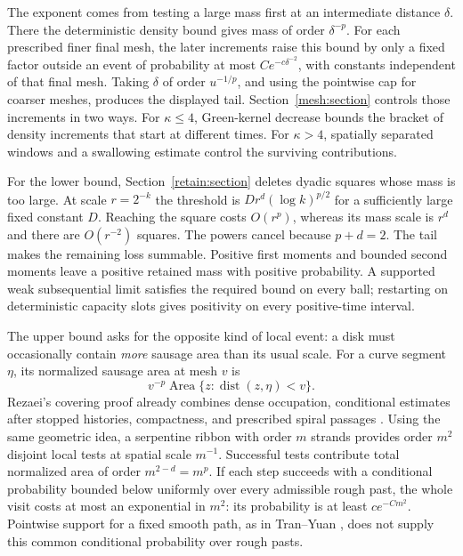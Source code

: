 The exponent comes from testing a large mass first at an intermediate
distance $\delta$. There the deterministic density bound gives mass
of order $\delta^{-p}$. For each prescribed finer final mesh, the
later increments raise this bound by only a fixed factor outside an
event of probability at most $Ce^{-c\delta^{-2}}$, with constants
independent of that final mesh. Taking $\delta$ of order $u^{-1/p}$,
and using the pointwise cap for coarser meshes, produces the displayed
tail. Section~\ref{mesh:section} controls those increments
in two ways. For $\kappa\le4$, Green-kernel decrease bounds the bracket
of density increments that start at different times. For $\kappa>4$,
spatially separated windows and a swallowing estimate control the
surviving contributions.

For the lower bound, Section~\ref{retain:section} deletes dyadic
squares whose mass is too large. At scale $r=2^{-k}$ the threshold is
$Dr^d(\log k)^{p/2}$ for a sufficiently large fixed constant $D$.
Reaching the square costs $O(r^p)$, whereas
its mass scale is $r^d$ and there are $O(r^{-2})$ squares.
The powers cancel because $p+d=2$. The tail makes the remaining
loss summable. Positive first moments and bounded second moments
leave a positive retained mass with positive probability. A supported
weak subsequential limit satisfies the required bound on every ball;
restarting on deterministic capacity slots gives positivity on every
positive-time interval.

The upper bound asks for the opposite kind of local event: a disk
must occasionally contain \emph{more} sausage area than its usual
scale. For a curve segment $\eta$, its normalized sausage area at
mesh $v$ is
\[
 v^{-p}\operatorname{Area}\{z:\operatorname{dist}(z,\eta)<v\}.
\]
Rezaei's covering proof already combines dense occupation, conditional
estimates after stopped histories, compactness, and prescribed spiral
passages \cite[Section~3, Lemmas~3.1--3.3]{rezaei2018}. Using the same
geometric idea, a serpentine ribbon with order $m$ strands provides order $m^2$
disjoint local tests at spatial scale $m^{-1}$. Successful tests
contribute total normalized area of order $m^{2-d}=m^p$. If each
step succeeds with a conditional probability bounded below uniformly
over every admissible rough past, the whole visit costs at most an
exponential in $m^2$: its probability is at least $ce^{-Cm^2}$.
Pointwise support for a fixed smooth path, as in Tran--Yuan
\cite[Theorem~1.1, Corollary~1.2, and Proposition~1.4]{tranyuan2020},
does not supply this common conditional probability over rough pasts.

